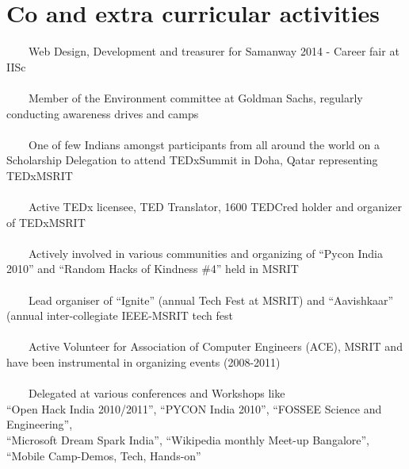 \documentclass[a4paper,10pt]{article} %
\newcommand{\tabitem}{~~\llap{\textbullet}~~}
\begin{document}
\section{Co and extra curricular activities}
\tabitem Web Design, Development and treasurer for Samanway 2014 - Career fair at IISc \\
\\ 
\tabitem Member of the Environment committee at Goldman Sachs, regularly conducting awareness drives and camps \\
\\
\tabitem One of few Indians amongst participants from all around the world on a Scholarship Delegation to attend TEDxSummit in Doha, Qatar representing TEDxMSRIT \\
\\
\tabitem Active TEDx licensee, TED Translator, 1600 TEDCred holder and organizer of TEDxMSRIT \\
\\
\tabitem Actively involved in various communities and organizing of “Pycon India 2010” and “Random Hacks of Kindness \#4” held in MSRIT\\
\\
\tabitem Lead organiser of “Ignite” (annual Tech Fest at MSRIT) and “Aavishkaar” (annual inter-collegiate IEEE-MSRIT tech fest\\
\\
\tabitem Active Volunteer for Association of Computer Engineers (ACE), MSRIT and have been instrumental in organizing events (2008-2011)\\
\\
\tabitem Delegated at various conferences and Workshops like \\
“Open Hack India 2010/2011”, “PYCON India 2010”, “FOSSEE Science and Engineering”, \\ 
“Microsoft Dream Spark India”, “Wikipedia monthly Meet-up Bangalore”, \\
“Mobile Camp-Demos, Tech, Hands-on”\\
\\


\end{document}
